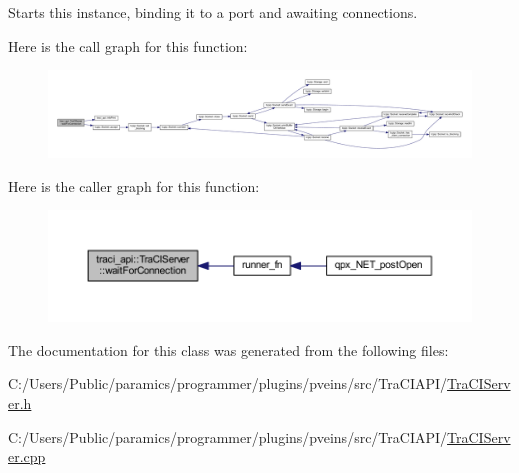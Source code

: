Starts this instance, binding it to a port and awaiting connections. 

Here is the call graph for this function\+:
\nopagebreak
\begin{figure}[H]
\begin{center}
\leavevmode
\includegraphics[width=350pt]{classtraci__api_1_1_tra_c_i_server_ac9cc474ec4ae6277c82cbf80f212852e_cgraph}
\end{center}
\end{figure}
Here is the caller graph for this function\+:
\nopagebreak
\begin{figure}[H]
\begin{center}
\leavevmode
\includegraphics[width=350pt]{classtraci__api_1_1_tra_c_i_server_ac9cc474ec4ae6277c82cbf80f212852e_icgraph}
\end{center}
\end{figure}


The documentation for this class was generated from the following files\+:\begin{DoxyCompactItemize}
\item 
C\+:/\+Users/\+Public/paramics/programmer/plugins/pveins/src/\+Tra\+C\+I\+A\+P\+I/\hyperlink{_tra_c_i_server_8h}{Tra\+C\+I\+Server.\+h}\item 
C\+:/\+Users/\+Public/paramics/programmer/plugins/pveins/src/\+Tra\+C\+I\+A\+P\+I/\hyperlink{_tra_c_i_server_8cpp}{Tra\+C\+I\+Server.\+cpp}\end{DoxyCompactItemize}
